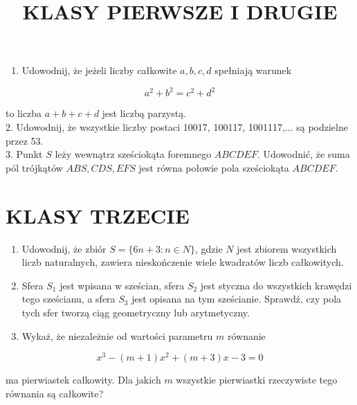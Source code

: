 \documentclass[10pt]{article}
\title{KLASY PIERWSZE I DRUGIE }
\author{}
\date{}
\begin{document}
\maketitle
\begin{enumerate}
  \item Udowodnij, że jeżeli liczby całkowite \(a, b, c, d\) spełniają warunek
\end{enumerate}

\[
a^{2}+b^{2}=c^{2}+d^{2}
\]

to liczba \(a+b+c+d\) jest liczbą parzystą.\\
2. Udowodnij, że wszystkie liczby postaci 10017, 100117, 1001117,... są podzielne przez 53.\\
3. Punkt \(S\) leży wewnątrz sześciokąta foremnego \(A B C D E F\). Udowodnić, że suma pól trójkątów \(A B S, C D S, E F S\) jest równa połowie pola sześciokąta \(A B C D E F\).

\section*{KLASY TRZECIE}
\begin{enumerate}
  \item Udowodnij, że zbiór \(S=\{6 n+3: n \in N\}\), gdzie \(N\) jest zbiorem wszystkich liczb naturalnych, zawiera nieskończenie wiele kwadratów liczb całkowitych.
  \item Sfera \(S_{1}\) jest wpisana w sześcian, sfera \(S_{2}\) jest styczna do wszystkich krawędzi tego sześcianu, a sfera \(S_{3}\) jest opisana na tym sześcianie. Sprawdź, czy pola tych sfer tworzą ciąg geometryczny lub arytmetyczny.
  \item Wykaż, że niezależnie od wartości parametru \(m\) równanie
\end{enumerate}

\[
x^{3}-(m+1) x^{2}+(m+3) x-3=0
\]

ma pierwiastek całkowity. Dla jakich \(m\) wszystkie pierwiastki rzeczywiste tego równania są całkowite?
\end{document}
